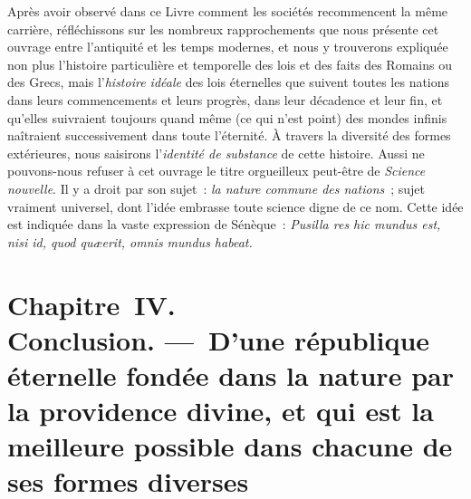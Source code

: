 \documentclass[french,twoside]{book} %
\newcommand\chapteropen{} %
\newcommand\chapterclose{} %
\begin{document}
Après avoir observé dans ce Livre comment les sociétés recommencent la même carrière, réfléchissons sur les nombreux rapprochements que nous présente cet ouvrage entre l’antiquité et les temps modernes, et nous y trouverons expliquée non plus l’histoire particulière et temporelle des lois et des faits des Romains ou des Grecs, mais l’{\itshape histoire idéale} des lois éternelles que suivent toutes les nations dans leurs commencements et leurs progrès, dans leur décadence et leur fin, et qu’elles suivraient toujours quand même (ce qui n’est point) des mondes infinis naîtraient successivement dans toute l’éternité. À travers la diversité des formes extérieures, nous saisirons l’{\itshape identité de substance} de cette histoire. Aussi ne pouvons-nous refuser à cet ouvrage le titre orgueilleux peut-être de {\itshape Science nouvelle}. Il y a droit par son sujet : {\itshape la nature commune des nations} ; sujet vraiment universel, dont l’idée embrasse toute science digne de ce nom. Cette idée est indiquée dans la vaste expression de Sénèque : \emph{{\itshape Pusilla res hic mundus est, nisi id, quod quæerit, omnis mundus habeat.}}
\chapterclose


\chapteropen
\chapter[{Chapitre IV. Conclusion. — D’une république éternelle fondée dans la nature par la providence divine, et qui est la meilleure possible dans chacune de ses formes diverses}]{Chapitre IV. \\
Conclusion. — D’une république éternelle fondée dans la nature par la providence divine, et qui est la meilleure possible dans chacune de ses formes diverses}
\end{document}
